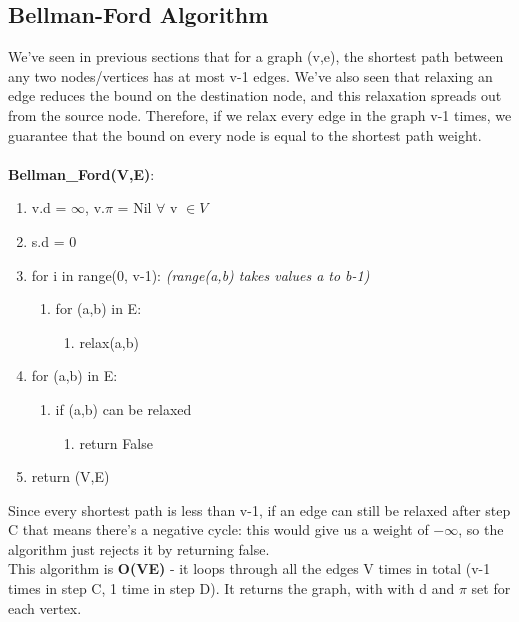 \subsection{Bellman-Ford Algorithm}
We've seen in previous sections that for a graph (v,e), the shortest path between any two nodes/vertices has at most v-1 edges. We've also seen that relaxing an edge reduces the bound on the destination node, and this relaxation spreads out from the source node. Therefore, if we relax every edge in the graph v-1 times, we guarantee that the bound on every node is equal to the shortest path weight. \\ \\
\textbf{Bellman\_Ford(V,E)}:
\begin{enumerate}[label=\Alph*]
    \item v.d = $\infty$, v.$\pi$ = Nil $\forall$ v $\in V$
    \item s.d = 0
    \item for i in range(0, v-1): \emph{(range(a,b) takes values a to b-1)}
\begin{enumerate}[label=\arabic*]
    \item [] for (a,b) in E:
    \begin{enumerate}
        \item [] relax(a,b)
    \end{enumerate}
\end{enumerate}    
    \item for (a,b) in E:
\begin{enumerate}[label=\arabic*]
    \item [] if (a,b) can be relaxed
    \begin{enumerate}
        \item [] return False
    \end{enumerate}
\end{enumerate}  
    \item return (V,E)
\end{enumerate}
Since every shortest path is less than v-1, if an edge can still be relaxed after step C that means there's a negative cycle: this would give us a weight of $-\infty$, so the algorithm just rejects it by returning false.\\
This algorithm is \textbf{O(VE)} - it loops through all the edges V times in total (v-1 times in step C, 1 time in step D). It returns the graph, with with d and $\pi$ set for each vertex.

